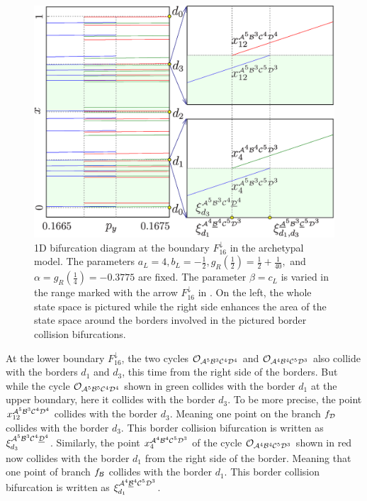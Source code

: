 \begin{figure}
	\centering
	\includegraphics[width=.7 \textwidth]{../Figures/6/6.7/result.png}
	\caption[1D bifurcation diagram at the boundary $F_{16}^\downarrow$ in the archetypal model]{
		1D bifurcation diagram at the boundary $F_{16}^\downarrow$ in the archetypal model.
		The parameters $a_L = 4, b_L = -\frac{1}{2}, g_R\left(\frac{1}{2}\right) = \frac{1}{2} + \frac{1}{40},$ and $\alpha = g_R\left(\frac{1}{4}\right) = -0.3775$ are fixed.
		The parameter $\beta = c_L$ is varied in the range marked with the arrow $F_{16}^\downarrow$ in .
		On the left, the whole state space is pictured while the right side enhances the area of the state space around the borders involved in the pictured border collision bifurcations.
	}
	\label{fig:arch.bif.F.down}
\end{figure}

At the lower boundary $F_{16}^\downarrow$, the two cycles $\mathcal{O}_{\mathcal{A}^5\mathcal{B}^3\mathcal{C}^4\mathcal{D}^4}$ and $\mathcal{O}_{\mathcal{A}^4\mathcal{B}^4\mathcal{C}^5\mathcal{D}^3}$ also collide with the borders $d_1$ and $d_3$, this time from the right side of the borders.
But while the cycle $\mathcal{O}_{\mathcal{A}^5\mathcal{B}^5\mathcal{C}^4\mathcal{D}^4}$ shown in green collides with the border $d_1$ at the upper boundary, here it collides with the border $d_3$.
To be more precise, the point $x_{12}^{\mathcal{A}^5\mathcal{B}^3\mathcal{C}^4\mathcal{D}^4}$ collides with the border $d_3$.
Meaning one point on the branch $f_{\mathcal{D}}$ collides with the border $d_3$.
This border collision bifurcation is written as $\xi_{d_3}^{\mathcal{A}^5\mathcal{B}^3\mathcal{C}^4\underline{\mathcal{D}}^4}$.
Similarly, the point $x_{4}^{\mathcal{A}^4\mathcal{B}^4\mathcal{C}^5\mathcal{D}^3}$ of the cycle $\mathcal{O}_{\mathcal{A}^4\mathcal{B}^4\mathcal{C}^5\mathcal{D}^3}$ shown in red now collides with the border $d_1$ from the right side of the border.
Meaning that one point of branch $f_{\mathcal{B}}$ collides with the border $d_1$.
This border collision bifurcation is written as $\xi_{d_1}^{\mathcal{A}^4\underline{\mathcal{B}}^4\mathcal{C}^5\mathcal{D}^3}$.


